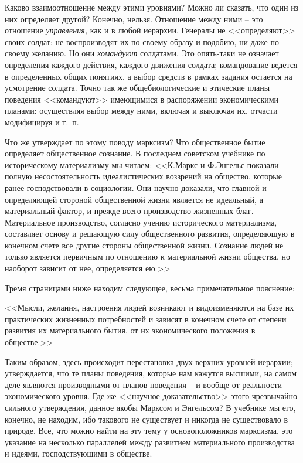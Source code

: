 \documentclass{book}
\begin{document}
Каково взаимоотношение между этими уровнями? Можно ли сказать, что один из них определяет другой? Конечно, нель­зя. Отношение 
между ними -- это отношение \textit{управления,}  как и в любой иерархии. Генералы не <<определяют>> своих солдат: не 
воспроизводят их по своему образу и подобию, ни даже по своему желанию. Но они \textit{командуют} солдатами. Это опять-таки не 
означает определения каждого действия, каждого движения солдата; командование ведется в определенных об­щих понятиях, а выбор 
средств в рамках задания остается на ус­мотрение солдата. Точно так же общебиологические и этические планы поведения <<командуют>> имеющимися в распоряжении экономическими планами: осуществляя выбор между ними, включая и выключая их, отчасти модифицируя и т.~п.

Что же утверждает по этому поводу марксизм? Что обще­ственное бытие определяет общественное сознание. В послед­нем советском 
учебнике по историческому материализму мы читаем: <<К.Маркс и Ф.Энгельс показали полную несостоятельность идеалистических 
воззрений на общество, которые ранее господ­ствовали в социологии. Они научно доказали, что главной и определяющей стороной 
общественной жизни является не иде­альный, а материальный фактор, и прежде всего производство жизненных благ. Материальное 
производство, согласно учению исторического материализма, составляет основу и решающую силу общественного развития, определяющую 
в конечном счете все другие стороны общественной жизни. Сознание людей не только является первичным по отношению к материальной 
жи­зни общества, но наоборот зависит от нее, определяется ею.>>

Тремя страницами ниже находим следующее, весьма приме­чательное пояснение:

<<Мысли, желания, настроения людей возникают и видоизме­няются на базе их практических жизненных потребностей и зависят в конечном 
счете от степени развития их материального бытия, от их экономического положения в обществе.>>

Таким образом, здесь происходит перестановка двух верхних уровней иерархии; утверждается, что те планы поведения, которые нам 
кажутся высшими, на самом деле являются производными от планов поведения -- и вообще от реальности -- экономи­ческого уровня. Где 
же <<научное доказательство>> этого чрезвычайно сильного утверждения, данное якобы Марксом и Энгельсом? В учебнике мы его, 
конечно, не находим, ибо такового не существует и никогда не существовало в природе. Все, что можно найти на эту тему у 
основоположников марксизма, это указание на несколько параллелей между развитием материального производства и идеями, 
господствующими в обществе.
\end{document}

